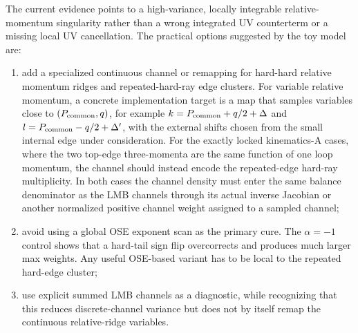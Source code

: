 \documentclass[11pt]{article}
\begin{document}
The current evidence points to a high-variance, locally integrable
relative-momentum singularity rather than a wrong integrated UV counterterm or a
missing local UV cancellation.  The practical options suggested by the toy
model are:
\begin{enumerate}
  \item add a specialized continuous channel or remapping for hard-hard
        relative momentum ridges and repeated-hard-ray edge clusters.  For
        variable relative momentum, a concrete implementation target is a map
        that samples variables close to \((P_{\rm common},q)\), for example
        \(k=P_{\rm common}+q/2+\Delta\) and
        \(l=P_{\rm common}-q/2+\Delta'\), with the external shifts chosen from
        the small internal edge under consideration.  For the exactly locked
        kinematics-A cases, where the two top-edge three-momenta are the same
        function of one loop momentum, the channel should instead encode the
        repeated-edge hard-ray multiplicity.  In both cases the channel
        density must enter the same balance denominator as the LMB channels
        through its actual inverse Jacobian or another normalized positive
        channel weight assigned to a sampled channel;
  \item avoid using a global OSE exponent scan as the primary cure.  The
        \(\alpha=-1\) control shows that a hard-tail sign flip overcorrects
        and produces much larger max weights.  Any useful OSE-based variant
        has to be local to the repeated hard-edge cluster;
  \item use explicit summed LMB channels as a diagnostic, while recognizing
        that this reduces discrete-channel variance but does not by itself
        remap the continuous relative-ridge variables.
\end{enumerate}
\end{document}
